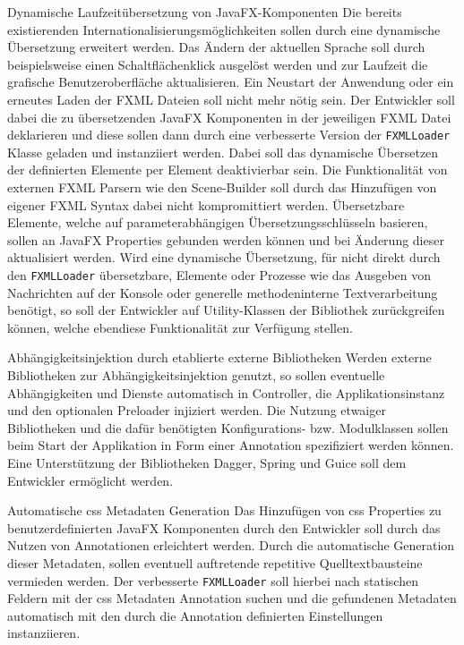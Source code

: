 \begin{freq}{Dynamische Laufzeitübersetzung von JavaFX-Komponenten}
	Die bereits existierenden Internationalisierungsmöglichkeiten sollen durch eine dynamische Übersetzung erweitert werden. Das Ändern der aktuellen Sprache soll durch beispielsweise einen Schaltflächenklick ausgelöst werden und zur Laufzeit die grafische Benutzeroberfläche aktualisieren. Ein Neustart der Anwendung oder ein erneutes Laden der FXML Dateien soll nicht mehr nötig sein. Der Entwickler soll dabei die zu übersetzenden JavaFX Komponenten in der jeweiligen FXML Datei deklarieren und diese sollen dann durch eine verbesserte Version der \texttt{FXMLLoader} Klasse geladen und instanziiert werden. Dabei soll das dynamische Übersetzen der definierten Elemente per Element deaktivierbar sein. Die Funktionalität von externen FXML Parsern wie den Scene-Builder soll durch das Hinzufügen von eigener FXML Syntax dabei nicht kompromittiert werden. Übersetzbare Elemente, welche auf parameterabhängigen Übersetzungsschlüsseln basieren, sollen an JavaFX Properties gebunden werden können und bei Änderung dieser aktualisiert werden. Wird eine dynamische Übersetzung, für nicht direkt durch den \texttt{FXMLLoader} übersetzbare, Elemente oder Prozesse wie das Ausgeben von Nachrichten auf der Konsole oder generelle methodeninterne Textverarbeitung benötigt, so soll der Entwickler auf Utility-Klassen der Bibliothek zurückgreifen können, welche ebendiese Funktionalität zur Verfügung stellen.
\end{freq}
\begin{freq}{Abhängigkeitsinjektion durch etablierte externe Bibliotheken}
	Werden externe Bibliotheken zur Abhängigkeitsinjektion genutzt, so sollen eventuelle Abhängigkeiten und Dienste automatisch in Controller, die Applikationsinstanz und den optionalen Preloader injiziert werden. Die Nutzung etwaiger Bibliotheken und die dafür benötigten Konfigurations- bzw. Modulklassen sollen beim Start der Applikation in Form einer Annotation spezifiziert werden können. Eine Unterstützung der Bibliotheken Dagger, Spring und Guice soll dem Entwickler ermöglicht werden.
\end{freq}
\begin{freq}{Automatische \ac{css} Metadaten Generation}
	Das Hinzufügen von \ac{css} Properties zu benutzerdefinierten JavaFX Komponenten durch den Entwickler soll durch das Nutzen von Annotationen erleichtert werden. Durch die automatische Generation dieser Metadaten, sollen eventuell auftretende repetitive Quelltextbausteine vermieden werden. Der verbesserte \texttt{FXMLLoader} soll hierbei nach statischen Feldern mit der \ac{css} Metadaten Annotation suchen und die gefundenen Metadaten automatisch mit den durch die Annotation definierten Einstellungen instanziieren.
\end{freq}
